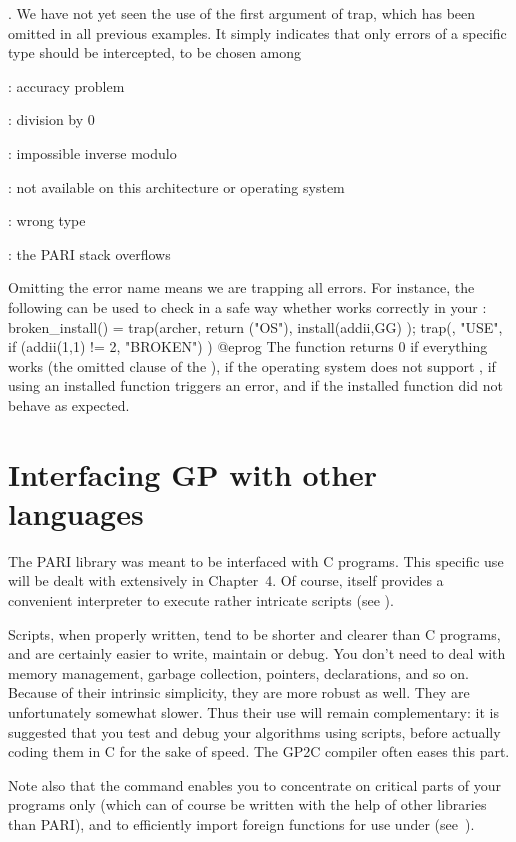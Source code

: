 . We have not yet seen the use of the
first argument of trap, which has been omitted in all previous examples. It
simply indicates that only errors of a specific type should be intercepted,
to be chosen among

: accuracy problem

: division by 0

: impossible inverse modulo

: not available on this architecture or operating system

: wrong type

: the PARI stack overflows

\noindent Omitting the error name means we are trapping all errors. For
instance, the following can be used to check in a safe way whether
 works correctly in your :
\bprog
broken_install() =
{
  trap(archer, return ("OS"),
    install(addii,GG)
  );
  trap(, "USE",
    if (addii(1,1) != 2, "BROKEN")
  )
}
@eprog
\noindent The function returns 0 if everything works (the omitted 
clause of the ),  if the operating system does not support
,  if using an installed function triggers an error,
and  if the installed function did not behave as expected.

\section{Interfacing GP with other languages}
\noindent
The PARI library was meant to be interfaced with C programs. This specific
use will be dealt with extensively in Chapter~4. Of course,  itself
provides a convenient  interpreter to execute rather intricate scripts (see
).

Scripts, when properly written, tend to be shorter and clearer than C
programs, and are certainly easier to write, maintain or debug. You don't
need to deal with memory management, garbage collection, pointers,
declarations, and so on. Because of their intrinsic simplicity, they are more
robust as well. They are unfortunately somewhat slower. Thus their use will
remain complementary: it is suggested that you test and debug your algorithms
using scripts, before actually coding them in C for the sake of speed.
The GP2C compiler often eases this part.

Note also that the  command enables you to concentrate on
critical parts of your programs only (which can of course be written with the
help of other libraries than PARI), and to efficiently import
foreign functions for use under  (see~).

